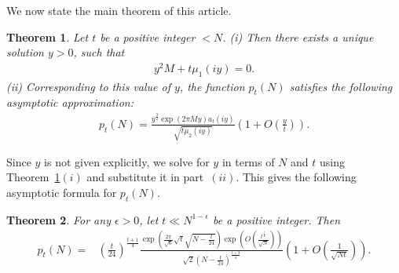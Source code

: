 \documentclass[10pt,a4paper]{amsart}
\newtheorem{theorem}{Theorem}[section]
\numberwithin{equation}{section}
\begin{document}
	We now state the main theorem of this article.

	\begin{theorem}\label{theorem-1.2}
		Let $t$ be a positive integer $<N$.
		\newline
		(i) Then there exists a unique solution $y>0$, such that
		\begin{align}\label{eq-1.1}
			y^{2}M+t\mu_{1}(iy)=0.
		\end{align}
		(ii) Corresponding to this value of $y$, the function $p_t(N)$ satisfies the following asymptotic approximation:
		\begin{align*}
			p_t(N)=\frac{y^{\frac{3}{2}}\exp(2\pi My)a_{t}(iy)}{\sqrt{t\mu_{2}(iy)}}\left(1+O\left(\frac{y}{t}\right)\right).    
		\end{align*}
	\end{theorem}

	Since $y$ is not given explicitly, we solve for $y$ in terms of $N$ and $t$ using Theorem~\ref{theorem-1.2}$(i)$ and substitute it in part~$(ii)$. This gives the following asymptotic formula for $p_t(N)$.
	\begin{theorem}\label{theorem-1.1}
		For any $\epsilon > 0$, let $t \ll N^{1 - \epsilon}$ be a positive integer. Then
		\begin{align*}
			p_t(N)=&\left(\frac{t}{24}\right)^{\frac{t+1}{4}}\frac{\exp\left(\frac{2\pi}{\sqrt{6}}\sqrt{t}\sqrt{N-\frac{t}{24}}\right)\exp\left(O\left(\frac{t^{\frac{3}{2}}}{\sqrt{N}}\right)\right)}{\sqrt{2}\left(N-\frac{t}{24}\right)^{\frac{t+3}{4}}}\left(1 + O\left(\frac{1}{\sqrt{Nt}}\right)\right). 
		\end{align*}
	\end{theorem}
	
\end{document}
